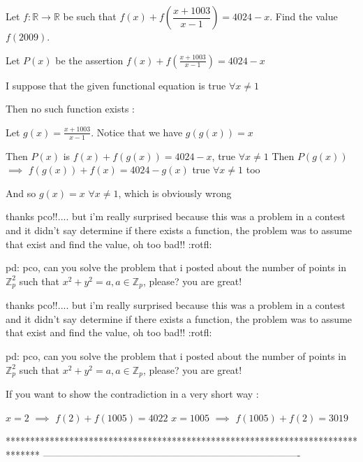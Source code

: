 \begin{solution}
	\begin{tcolorbox}Let $ f : \mathbb{R} \rightarrow \mathbb{R}$ be such that $ f(x) + f(\dfrac{x + 1003}{x - 1}) = 4024 - x$. Find the value $ f(2009)$.\end{tcolorbox}

Let $ P(x)$ be the assertion $ f(x)+f(\frac{x+1003}{x-1})=4024-x$

I suppose that the given functional equation is true $ \forall x\neq 1$

Then no such function exists : 

Let $ g(x)=\frac{x+1003}{x-1}$. Notice that we have $ g(g(x))=x$

Then $ P(x)$ is  $ f(x)+f(g(x))=4024-x$, true $ \forall x\neq 1$
Then $ P(g(x))$ $ \implies$ $ f(g(x))+f(x)=4024-g(x)$ true $ \forall x\neq 1$ too

And so $ g(x)=x$ $ \forall x\neq 1$, which is obviously wrong
\end{solution}



\begin{solution}
	thanks pco!!.... but i'm really surprised because this was a problem in a contest and it didn't say determine if there exists a function, the problem was to assume that exist and find the value, oh too bad!! :rotfl:

p\/d: pco, can you solve the problem that i posted about the number of points in $ \mathbb{Z}_{p}^{2}$ such that $ x^{2}+y^{2} = a, a \in \mathbb{Z}_{p}$, please? you are great!
\end{solution}



\begin{solution}
	\begin{tcolorbox}thanks pco!!.... but i'm really surprised because this was a problem in a contest and it didn't say determine if there exists a function, the problem was to assume that exist and find the value, oh too bad!! :rotfl:

p\/d: pco, can you solve the problem that i posted about the number of points in $ \mathbb{Z}_{p}^{2}$ such that $ x^{2} + y^{2} = a, a \in \mathbb{Z}_{p}$, please? you are great!\end{tcolorbox}

If you want to show the contradiction in a very short way :

$ x=2$ $ \implies$ $ f(2)+f(1005)=4022$
$ x=1005$ $ \implies$ $ f(1005)+f(2)=3019$
\end{solution}
*******************************************************************************
-------------------------------------------------------------------------------

